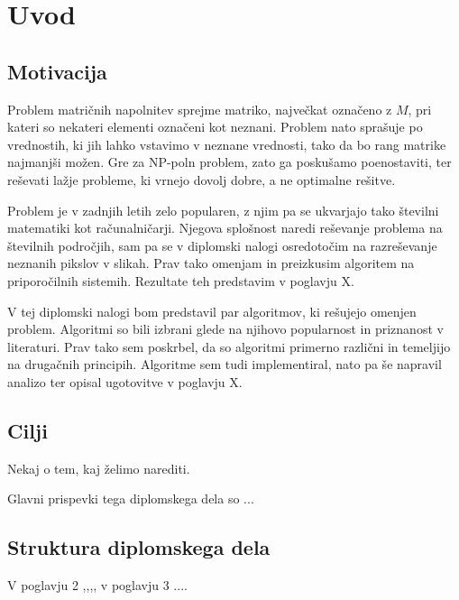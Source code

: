\chapter{Uvod}
\section{Motivacija}
Problem matričnih napolnitev sprejme matriko, največkat označeno z $M$, pri kateri so nekateri elementi označeni kot neznani. Problem nato sprašuje po vrednostih, ki jih lahko vstavimo v neznane vrednosti, tako da bo rang matrike najmanjši možen. Gre za NP-poln problem, zato ga poskušamo poenostaviti, ter reševati lažje probleme, ki vrnejo dovolj dobre, a ne optimalne rešitve. 

Problem je v zadnjih letih zelo popularen, z njim pa se ukvarjajo tako številni matematiki kot računalničarji. Njegova splošnost naredi reševanje problema na številnih področjih, sam pa se v diplomski nalogi osredotočim na razreševanje neznanih pikslov v slikah. Prav tako omenjam in preizkusim algoritem na priporočilnih sistemih. Rezultate teh predstavim v poglavju X.

V tej diplomski nalogi bom predstavil par  algoritmov, ki rešujejo omenjen problem. Algoritmi so bili izbrani glede na njihovo popularnost in priznanost v literaturi. Prav tako sem poskrbel, da so algoritmi primerno različni in temeljijo na drugačnih principih. Algoritme sem tudi implementiral, nato pa še napravil analizo ter opisal ugotovitve v poglavju X.

\section{Cilji}

Nekaj o tem, kaj želimo narediti.

Glavni prispevki tega diplomskega dela so ...

\section{Struktura diplomskega dela}

V poglavju 2 ,,,, v poglavju 3 ....